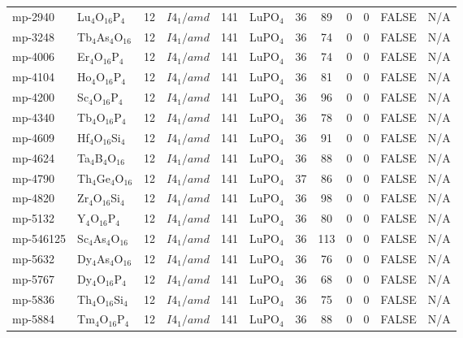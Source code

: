 {\begin{longtable}{llcccccccccc}
    mp-2940 & Lu$_{4}$O$_{16}$P$_{4}$ & 12    & $I4_1/amd$ & 141   & LuPO$_{4}$ & 36    & 89    & 0     & 0     & FALSE & N/A \\
    mp-3248 & Tb$_{4}$As$_{4}$O$_{16}$ & 12    & $I4_1/amd$ & 141   & LuPO$_{4}$ & 36    & 74    & 0     & 0     & FALSE & N/A \\
    mp-4006 & Er$_{4}$O$_{16}$P$_{4}$ & 12    & $I4_1/amd$ & 141   & LuPO$_{4}$ & 36    & 74    & 0     & 0     & FALSE & N/A \\
    mp-4104 & Ho$_{4}$O$_{16}$P$_{4}$ & 12    & $I4_1/amd$ & 141   & LuPO$_{4}$ & 36    & 81    & 0     & 0     & FALSE & N/A \\
    mp-4200 & Sc$_{4}$O$_{16}$P$_{4}$ & 12    & $I4_1/amd$ & 141   & LuPO$_{4}$ & 36    & 96    & 0     & 0     & FALSE & N/A \\
    mp-4340 & Tb$_{4}$O$_{16}$P$_{4}$ & 12    & $I4_1/amd$ & 141   & LuPO$_{4}$ & 36    & 78    & 0     & 0     & FALSE & N/A \\
    mp-4609 & Hf$_{4}$O$_{16}$Si$_{4}$ & 12    & $I4_1/amd$ & 141   & LuPO$_{4}$ & 36    & 91    & 0     & 0     & FALSE & N/A \\
    mp-4624 & Ta$_{4}$B$_{4}$O$_{16}$ & 12    & $I4_1/amd$ & 141   & LuPO$_{4}$ & 36    & 88    & 0     & 0     & FALSE & N/A \\
    mp-4790 & Th$_{4}$Ge$_{4}$O$_{16}$ & 12    & $I4_1/amd$ & 141   & LuPO$_{4}$ & 37    & 86    & 0     & 0     & FALSE & N/A \\
    mp-4820 & Zr$_{4}$O$_{16}$Si$_{4}$ & 12    & $I4_1/amd$ & 141   & LuPO$_{4}$ & 36    & 98    & 0     & 0     & FALSE & N/A \\
    mp-5132 & Y$_{4}$O$_{16}$P$_{4}$ & 12    & $I4_1/amd$ & 141   & LuPO$_{4}$ & 36    & 80    & 0     & 0     & FALSE & N/A \\
    mp-546125 & Sc$_{4}$As$_{4}$O$_{16}$ & 12    & $I4_1/amd$ & 141   & LuPO$_{4}$ & 36    & 113   & 0     & 0     & FALSE & N/A \\
    mp-5632 & Dy$_{4}$As$_{4}$O$_{16}$ & 12    & $I4_1/amd$ & 141   & LuPO$_{4}$ & 36    & 76    & 0     & 0     & FALSE & N/A \\
    mp-5767 & Dy$_{4}$O$_{16}$P$_{4}$ & 12    & $I4_1/amd$ & 141   & LuPO$_{4}$ & 36    & 68    & 0     & 0     & FALSE & N/A \\
    mp-5836 & Th$_{4}$O$_{16}$Si$_{4}$ & 12    & $I4_1/amd$ & 141   & LuPO$_{4}$ & 36    & 75    & 0     & 0     & FALSE & N/A \\
    mp-5884 & Tm$_{4}$O$_{16}$P$_{4}$ & 12    & $I4_1/amd$ & 141   & LuPO$_{4}$ & 36    & 88    & 0     & 0     & FALSE & N/A \\

\end{longtable}}
